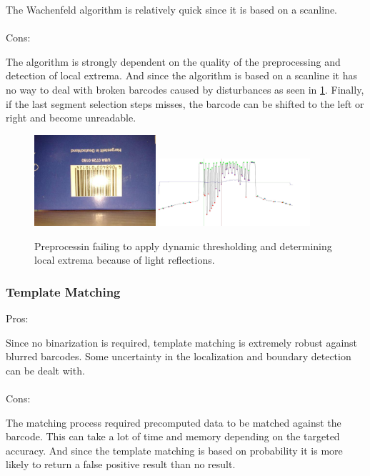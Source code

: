 The Wachenfeld algorithm is relatively quick since it is based on a scanline.
\\
\\
Cons:

The algorithm is strongly dependent on the quality of the preprocessing and detection of local extrema. And since the algorithm is based on a scanline it has no way to deal with broken barcodes caused by disturbances as seen in \cref{failwachenfeld}. Finally, if the last segment selection steps misses, the barcode can be shifted to the left or right and become unreadable.

\begin{figure}[t]
\center
\includegraphics[width=0.4\textwidth,natwidth=800,natheight=600]{img/wachenfeldfail.jpg}
\hspace{1cm}
\includegraphics[width=0.5\textwidth,natwidth=1800,natheight=800]{img/wachenfeldfail2.jpg}
\caption{Preprocessin failing to apply dynamic thresholding and determining local extrema because of light reflections.}
\label{failwachenfeld}
\end{figure}
 
\subsubsection*{Template Matching}
Pros:

Since no binarization is required, template matching is extremely robust against
blurred barcodes. Some uncertainty in the localization and boundary detection
can be dealt with.
\\
\\
Cons:

The matching process required precomputed data to be matched against the barcode. This can take a lot of time and memory depending on the targeted accuracy. And since the template matching is based on probability it is more likely to return a false positive result than no result.
\vfill %

